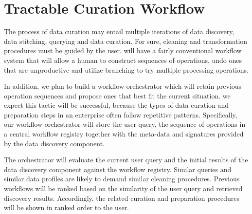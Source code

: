 \section{Tractable Curation Workflow}
\label{sec:workflow}

The process of data curation may entail multiple iterations of data discovery, data stitching, querying and data curation. For sure, cleaning and transformation procedures must be guided by the user. \dcv will have a fairly conventional workflow system that will allow a human to construct sequences of operations, undo ones that are unproductive and utilize branching to try multiple processing operations.


In addition, we plan to build a workflow orchestrator which will retain previous operation sequences and propose ones that best fit the current situation. we expect this tactic will be successful, because the types of data curation and preparation steps in an enterprise often follow repetitive patterns.  Specifically, our workflow orchestrator will store the user query, the sequence of operations in a central workflow registry together with the meta-data and signatures provided by the data discovery component. 


The orchestrator will evaluate the current user query and the initial results of the data discovery component against the workflow registry. Similar queries and similar data profiles are likely to demand similar cleaning procedures. Previous workflows will be ranked based on the similarity of the user query and retrieved discovery results. Accordingly, the related curation and preparation procedures will be shown in ranked order to the user.